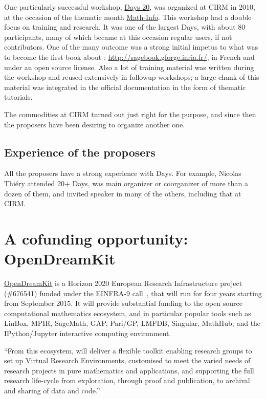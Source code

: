 \documentclass[12pt]{amsbook}
\begin{document}
One particularly successful workshop,
\href{https://www.lirmm.fr/arith/wiki/MathInfo2010/SageDays}{\Sage
  Days 20}, was organized at CIRM in 2010, at the occasion of the
thematic month
\href{https://www.lirmm.fr/arith/wiki/MathInfo2010/}{Math-Info}. This
workshop had a double focus on training and research. It was one of
the largest \Sage Days, with about 80 participants, many of which
became at this occasion regular \Sage users, if not contributors. One
of the many outcome was a strong initial impetus to what was to become
the first book about \Sage: \href{Calcul Mathématique avec
  Sage}{http://sagebook.gforge.inria.fr/}, in French and under an open
source license. Also a lot of training material was written during the
workshop and reused extensively in followup workshops; a large chunk
of this material was integrated in the \Sage official documentation in
the form of thematic tutorials.

The commodities at CIRM turned out just right for the purpose, and
since then the proposers have been desiring to organize another one.

\subsection{Experience of the proposers}

All the proposers have a strong experience with \Sage Days. For
example, Nicolas Thiéry attended 20+ \Sage Days, was main organizer or
coorganizer of more than a dozen of them, and invited speaker in many
of the others, including that at CIRM.

\section{A cofunding opportunity: OpenDreamKit}

\href{http://opendreamkit.org}{OpenDreamKit} is a Horizon 2020
European Research Infrastructure project (\#676541) funded under the
EINFRA-9 call~\cite{EINFRA-9}, that will run for four years starting
from September 2015. It will provide substantial funding to the open
source computational mathematics ecosystem, and in particular popular
tools such as LinBox, MPIR, SageMath, GAP, Pari/GP, LMFDB, Singular,
MathHub, and the IPython/Jupyter interactive computing environment.

``From this ecosystem, \ODK will deliver a flexible toolkit enabling
research groups to set up Virtual Research Environments, customised to
meet the varied needs of research projects in pure mathematics and
applications, and supporting the full research life-cycle from
exploration, through proof and publication, to archival and sharing of
data and code.''
\end{document}
